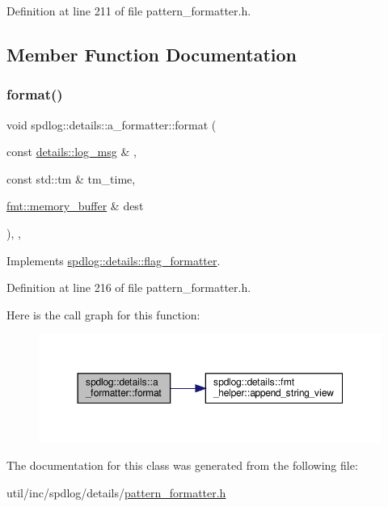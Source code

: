 Definition at line 211 of file pattern\+\_\+formatter.\+h.



\subsection{Member Function Documentation}
\mbox{\label{classspdlog_1_1details_1_1a__formatter_a0dbb4322f91afd22b82fc0c0b20a35db}} 
\subsubsection{\texorpdfstring{format()}{format()}}
{\footnotesize\ttfamily void spdlog\+::details\+::a\+\_\+formatter\+::format (\begin{DoxyParamCaption}\item[{const \hyperlink{structspdlog_1_1details_1_1log__msg}{details\+::log\+\_\+msg} \&}]{,  }\item[{const std\+::tm \&}]{tm\+\_\+time,  }\item[{\hyperlink{format_8h_a21cbf729f69302f578e6db21c5e9e0d2}{fmt\+::memory\+\_\+buffer} \&}]{dest }\end{DoxyParamCaption})\hspace{0.3cm}{\ttfamily [inline]}, {\ttfamily [override]}, {\ttfamily [virtual]}}



Implements \hyperlink{classspdlog_1_1details_1_1flag__formatter_a33fb3e42a4c8200cceb833d92b53fb67}{spdlog\+::details\+::flag\+\_\+formatter}.



Definition at line 216 of file pattern\+\_\+formatter.\+h.

Here is the call graph for this function\+:
\nopagebreak
\begin{figure}[H]
\begin{center}
\leavevmode
\includegraphics[width=350pt]{classspdlog_1_1details_1_1a__formatter_a0dbb4322f91afd22b82fc0c0b20a35db_cgraph}
\end{center}
\end{figure}


The documentation for this class was generated from the following file\+:\begin{DoxyCompactItemize}
\item 
util/inc/spdlog/details/\hyperlink{pattern__formatter_8h}{pattern\+\_\+formatter.\+h}\end{DoxyCompactItemize}
